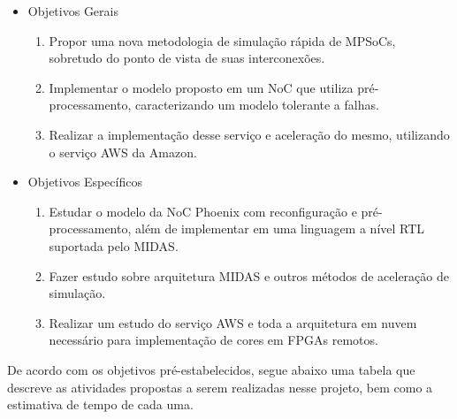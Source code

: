 \documentclass[conference]{IEEEtran}
\begin{document}
\begin{itemize}
	\item Objetivos Gerais\\
	\begin{enumerate}
		\item Propor uma nova metodologia de simulação rápida de MPSoCs, sobretudo do ponto de vista de suas interconexões.
		\item Implementar o modelo proposto em um NoC que utiliza pré-processamento, caracterizando um modelo tolerante a falhas.
		\item Realizar a implementação desse serviço e aceleração do mesmo, utilizando o serviço AWS da Amazon.
		\\
	\end{enumerate}
	\item  Objetivos Específicos
		\begin{enumerate}
		\item Estudar o modelo da NoC Phoenix com reconfiguração e pré-processamento, além de implementar em uma linguagem a nível RTL suportada pelo MIDAS.
	    \item Fazer estudo sobre arquitetura MIDAS e outros métodos de aceleração de simulação.
      	\item Realizar um estudo do serviço AWS e toda a arquitetura em nuvem necessário para implementação de cores em FPGAs remotos.
      	\\
	\end{enumerate}
\end{itemize}

De acordo com os objetivos pré-estabelecidos, segue abaixo uma tabela que descreve as atividades propostas a serem realizadas nesse projeto, bem como a estimativa de tempo de cada uma.\\
\end{document}
